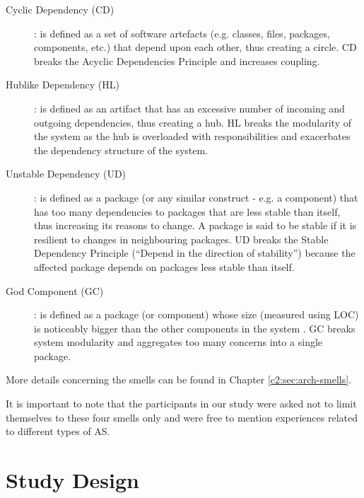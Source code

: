 \begin{description}
	\item[Cyclic Dependency (CD)]: is defined as a set of software artefacts (e.g. classes, files, packages, components, etc.) that depend upon each other, thus creating a circle. CD breaks the Acyclic Dependencies Principle \cite{Martin2018} and increases coupling.
	
	\item[Hublike Dependency (HL)]: is defined as an artifact that has an excessive number of incoming and outgoing dependencies, thus creating a hub. HL breaks the modularity of the system as the hub is overloaded with responsibilities and exacerbates the dependency structure of the system.

	\item[Unstable Dependency (UD)]: is defined as a package (or any similar construct - e.g. a component) that has too many dependencies to packages that are less stable than itself, thus increasing its reasons to change. A package is said to be stable if it is resilient to changes in neighbouring packages. UD breaks the Stable Dependency Principle (“Depend in the direction of stability”) \cite{Martin2018} because the affected package depends on packages less stable than itself.
	
	\item[God Component (GC)]: is defined as a package (or component) whose size (measured using LOC) is noticeably bigger than the other components in the system  \cite{Lippert2006}. GC breaks system modularity and aggregates too many concerns into a single package.
\end{description}
More details concerning the smells can be found in Chapter \ref{c2:sec:arch-smells}.

It is important to note that the participants in our study were asked not to limit themselves to these four smells only and were free to mention experiences related to different types of AS.

\section{Study Design}
